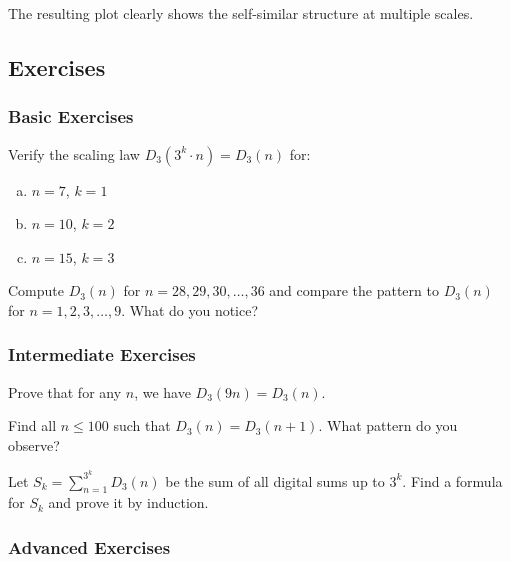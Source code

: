 The resulting plot clearly shows the self-similar structure at multiple scales.

\subsection{Exercises}
\label{subsec:fractal-exercises}

\subsubsection*{Basic Exercises}

\begin{exercise}
Verify the scaling law $D_3(3^k \cdot n) = D_3(n)$ for:
\begin{enumerate}[(a)]
\item $n = 7$, $k = 1$
\item $n = 10$, $k = 2$
\item $n = 15$, $k = 3$
\end{enumerate}
\end{exercise}

\begin{exercise}
Compute $D_3(n)$ for $n = 28, 29, 30, \ldots, 36$ and compare the pattern to $D_3(n)$ for $n = 1, 2, 3, \ldots, 9$. What do you notice?
\end{exercise}

\subsubsection*{Intermediate Exercises}

\begin{exercise}
Prove that for any $n$, we have $D_3(9n) = D_3(n)$.
\end{exercise}

\begin{exercise}
Find all $n \leq 100$ such that $D_3(n) = D_3(n+1)$. What pattern do you observe?
\end{exercise}

\begin{exercise}
Let $S_k = \sum_{n=1}^{3^k} D_3(n)$ be the sum of all digital sums up to $3^k$. Find a formula for $S_k$ and prove it by induction.
\end{exercise}

\subsubsection*{Advanced Exercises}

